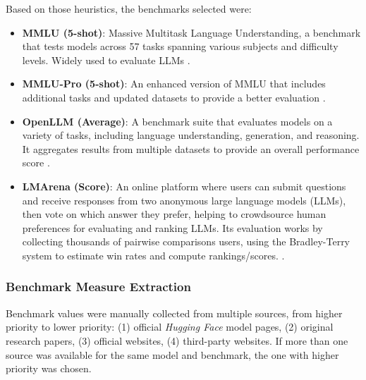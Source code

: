         Based on those heuristics, the benchmarks selected were:
        \begin{itemize}
            \item \textbf{MMLU (5-shot)}: Massive Multitask Language Understanding, a benchmark that tests models across 57 tasks spanning various subjects and difficulty levels. Widely used to evaluate LLMs \cite{Hendrycks2020}.

            \item \textbf{MMLU-Pro (5-shot)}: An enhanced version of MMLU that includes additional tasks and updated datasets to provide a better evaluation \cite{MMPro2024}.
            
            \item \textbf{OpenLLM (Average)}: A benchmark suite that evaluates models on a variety of tasks, including language understanding, generation, and reasoning. It aggregates results from multiple datasets to provide an overall performance score \cite{Myrzakhan2024}.
            
            \item \textbf{LMArena (Score)}: An online platform where users can submit questions and receive responses from two anonymous large language models (LLMs), then vote on which answer they prefer, helping to crowdsource human preferences for evaluating and ranking LLMs. Its evaluation works by collecting thousands of pairwise comparisons users, using  the Bradley-Terry system to estimate win rates and compute rankings/scores. \cite{Chiang2024}.
        \end{itemize}

    \subsubsection{Benchmark Measure Extraction}

        Benchmark values were manually collected from multiple sources, from higher priority to lower priority: (1) official \textit{Hugging Face} model pages, (2) original research papers, (3) official websites, (4) third-party websites. If more than one source was available for the same model and benchmark, the one with higher priority was chosen.
        
